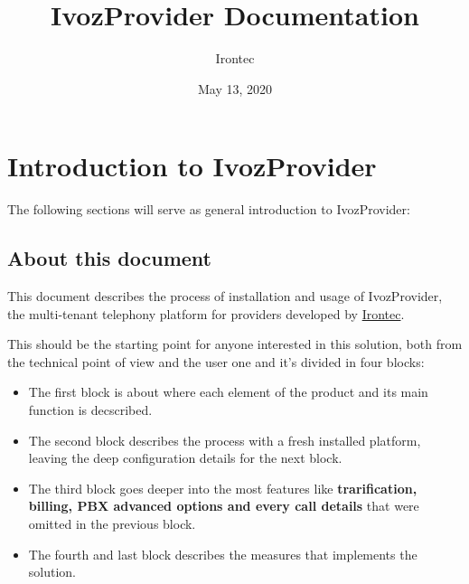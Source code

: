 \documentclass[letterpaper,10pt,english]{sphinxmanual}
\title{IvozProvider Documentation}
\date{May 13, 2020}
\author{Irontec}
\begin{document}
\maketitle
\tableofcontents
{}\label{index::doc}



\chapter{Introduction to IvozProvider}
\label{intro/index::doc}\label{intro/index:introduction-to-ivozprovider}\label{intro/index:ivozprovider-official-documentation}
The following sections will serve as general introduction to IvozProvider:


\section{About this document}
\label{intro/about:about-this-document}\label{intro/about::doc}
This document describes the process of installation and usage of
IvozProvider, the multi-tenant telephony platform for providers developed
by \href{http://irontec.com}{Irontec}.

This should be the starting point for anyone interested in this solution,
both  from the technical point of view and the user one and it's divided
in four blocks:
\begin{itemize}
\item {} 
The first block is about {\hyperref[index:concepts]{}} where each element of the
product and its main function is decscribed.

\item {} 
The second block describes the {\hyperref[index:installation]{}} process with a fresh
installed platform, leaving the deep configuration details for the next
block.

\item {} 
The third block goes deeper into the most {\hyperref[index:advanced]{}} features like
\textbf{trarification, billing, PBX advanced options and every call details}
that were omitted in the previous block.

\item {} 
The fourth and last block describes the {\hyperref[index:security]{}} measures that
implements the solution.

\end{itemize}
\end{document}
